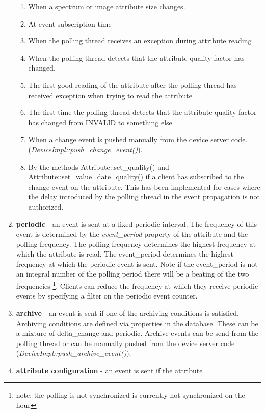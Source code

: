 \begin{enumerate}
\begin{enumerate}
\item When a spectrum or image attribute size changes.
\item At event subscription time
\item When the polling thread receives an exception during attribute reading
\item When the polling thread detects that the attribute quality factor
has changed.
\item The first good reading of the attribute after the polling thread has
received exception when trying to read the attribute
\item The first time the polling thread detects that the attribute quality
factor has changed from INVALID to something else
\item When a change event is pushed manually from the device server code.
(\emph{DeviceImpl::push\_change\_event()}).
\item By the methods Attribute::set\_quality() and Attribute::set\_value\_date\_quality()
if a client has subscribed to the change event on the attribute. This
has been implemented for cases where the delay introduced by the polling
thread in the event propagation is not authorized.
\end{enumerate}
\item \textbf{periodic} - an event is sent at a fixed periodic
interval. The frequency of this event is determined by the \emph{event\_period}
property of the attribute and the polling frequency. The polling frequency
determines the highest frequency at which the attribute is read. The
event\_period determines the highest frequency at which the periodic
event is sent. Note if the event\_period is not an integral number
of the polling period there will be a beating of the two frequencies%
\footnote{note: the polling is not synchronized is currently not synchronized
on the hour%
}. Clients can reduce the frequency at which they receive periodic
events by specifying a filter on the periodic event counter. 
\item \textbf{archive} - an event is sent if one of the
archiving conditions is satisfied. Archiving conditions are defined
via properties in the database. These can be a mixture of delta\_change
and periodic. Archive events can be send from the polling thread or
can be manually pushed from the device server code (\emph{DeviceImpl::push\_archive\_event()}).
\item \textbf{attribute configuration} - an event is sent if the attribute

\end{enumerate}
